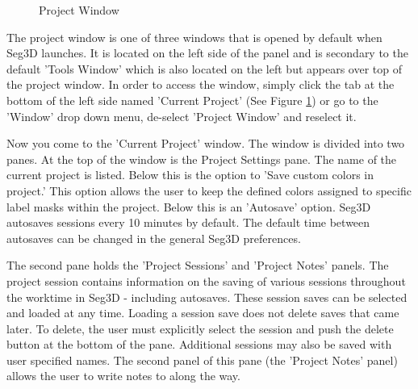 \documentclass[fleqn,11pt,openany]{book}
\begin{document}
\begin{figure}
\caption{Project Window}\label{fig:ProjectWindow}
\end{figure}
The project window is one of three windows that is opened by default when Seg3D launches.  
It is located on the left side of the panel and is secondary to the default 'Tools Window' which is also 
located on the left but appears over top of the project window.  
In order to access the window, simply click the tab at the bottom of the left side named 'Current Project' (See Figure \ref{fig:ProjectWindow}) or go to the 'Window' drop down menu, de-select 
'Project Window' and reselect it.

Now you come to the 'Current Project' window.  
The window is divided into two panes.  
At the top of the window is the Project Settings pane.  
The name of the current project is listed.  
Below this is the option to 'Save custom colors in project.'  
This option allows the user to keep the defined colors assigned to specific label masks within the project.  
Below this is an 'Autosave' option. Seg3D autosaves sessions every 10 minutes by default.  
The default time between autosaves can be changed in the general Seg3D preferences.

The second pane holds the 'Project Sessions' and 'Project Notes' panels.  
The project session contains information on the saving of various sessions throughout the worktime in Seg3D - including autosaves.  
These session saves can be selected and loaded at any time.  
Loading a session save does not delete saves that came later.  
To delete, the user must explicitly select the session and push the delete button at the bottom of the pane.  
Additional sessions may also be saved with user specified names.  
The second panel of this pane (the 'Project Notes' panel) allows the user to write notes to along the way.
\end{document}
